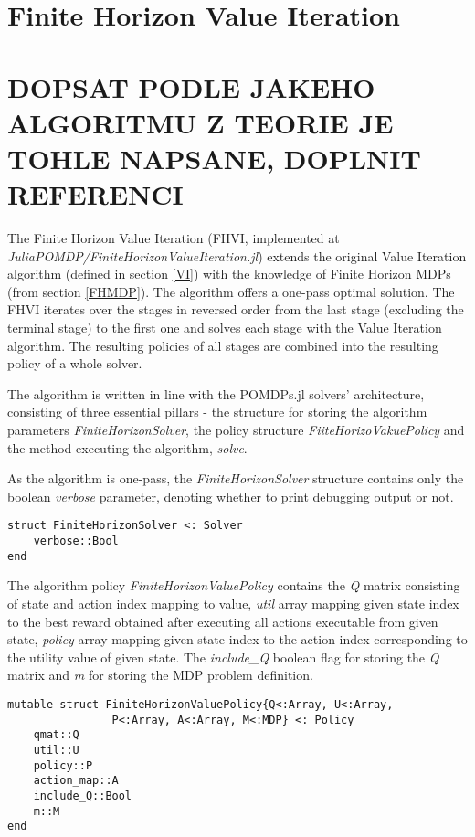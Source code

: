 \section{Finite Horizon Value Iteration}

\section{DOPSAT PODLE JAKEHO ALGORITMU Z TEORIE JE TOHLE NAPSANE, DOPLNIT REFERENCI}

The Finite Horizon Value Iteration (FHVI, implemented at \textit{JuliaPOMDP/FiniteHorizonValueIteration.jl}) extends the original Value Iteration  algorithm (defined in section \ref{VI}) with the knowledge of Finite Horizon MDPs (from section \ref{FHMDP}). The algorithm offers a one-pass optimal solution. The FHVI iterates over the stages in reversed order from the last stage (excluding the terminal stage) to the first one and solves each stage with the Value Iteration algorithm. The resulting policies of all stages are combined into the resulting policy of a whole solver.

The algorithm is written in line with the POMDPs.jl solvers' architecture, consisting of three essential pillars - the structure for storing the algorithm parameters \textit{FiniteHorizonSolver}, the policy structure \textit{FiiteHorizoVakuePolicy} and the method executing the algorithm, \textit{solve}.

As the algorithm is one-pass, the \textit{FiniteHorizonSolver} structure contains only the boolean \textit{verbose} parameter, denoting whether to print debugging output or not.

\begin{verbatim}
struct FiniteHorizonSolver <: Solver 
    verbose::Bool 
end 
\end{verbatim}

The algorithm policy \textit{FiniteHorizonValuePolicy} contains the \textit{Q} matrix consisting of state and action index mapping to value, \textit{util} array mapping given state index to the best reward obtained after executing all actions executable from given state, \textit{policy} array mapping given state index to the action index corresponding to the utility value of given state. The \textit{include\_Q} boolean flag for storing the \textit{Q} matrix and \textit{m} for storing the MDP problem definition.


\begin{samepage}
\begin{verbatim}
mutable struct FiniteHorizonValuePolicy{Q<:Array, U<:Array, 
                P<:Array, A<:Array, M<:MDP} <: Policy
    qmat::Q
    util::U
    policy::P
    action_map::A
    include_Q::Bool
    m::M
end
\end{verbatim}
\end{samepage}

